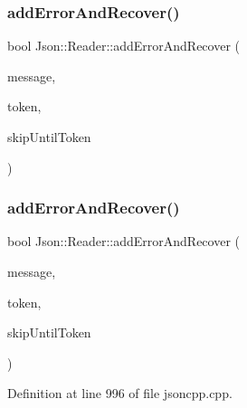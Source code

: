 \subsubsection{\texorpdfstring{add\+Error\+And\+Recover()}{addErrorAndRecover()}\hspace{0.1cm}{\footnotesize\ttfamily [1/2]}}
{\footnotesize\ttfamily bool Json\+::\+Reader\+::add\+Error\+And\+Recover (\begin{DoxyParamCaption}\item[{const \hyperlink{config_8h_a1e723f95759de062585bc4a8fd3fa4be}{J\+S\+O\+N\+C\+P\+P\+\_\+\+S\+T\+R\+I\+NG} \&}]{message,  }\item[{\hyperlink{class_json_1_1_reader_1_1_token}{Token} \&}]{token,  }\item[{\hyperlink{class_json_1_1_reader_aa35e6ab574dc399a0a645ad98ed66bc9}{Token\+Type}}]{skip\+Until\+Token }\end{DoxyParamCaption})\hspace{0.3cm}{\ttfamily [private]}}

\hypertarget{class_json_1_1_reader_a478db8ac6d00db1409608a37b66bc38d}{}\label{class_json_1_1_reader_a478db8ac6d00db1409608a37b66bc38d} 
\subsubsection{\texorpdfstring{add\+Error\+And\+Recover()}{addErrorAndRecover()}\hspace{0.1cm}{\footnotesize\ttfamily [2/2]}}
{\footnotesize\ttfamily bool Json\+::\+Reader\+::add\+Error\+And\+Recover (\begin{DoxyParamCaption}\item[{const \hyperlink{config_8h_a1e723f95759de062585bc4a8fd3fa4be}{J\+S\+O\+N\+C\+P\+P\+\_\+\+S\+T\+R\+I\+NG} \&}]{message,  }\item[{\hyperlink{class_json_1_1_reader_1_1_token}{Token} \&}]{token,  }\item[{\hyperlink{class_json_1_1_reader_aa35e6ab574dc399a0a645ad98ed66bc9}{Token\+Type}}]{skip\+Until\+Token }\end{DoxyParamCaption})\hspace{0.3cm}{\ttfamily [private]}}



Definition at line 996 of file jsoncpp.\+cpp.

